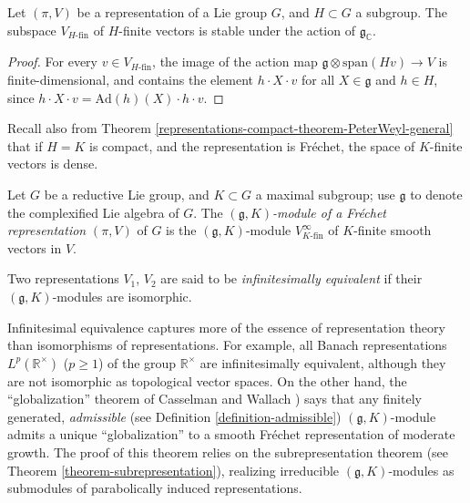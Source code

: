 \begin{lemma}
 \label{lemma-gK-of-representation}
Let $(\pi, V)$ be a representation of a Lie group $G$, and $H\subset G$ a subgroup. The subspace $V_{H\text{-fin}}$ of $H$-finite vectors is stable under the action of $\mathfrak g_{\mathbb C}$.
\end{lemma}

\begin{proof}
 For every $v\in V_{H\text{-fin}}$, the image of the action map $\mathfrak g \otimes \text{span}(Hv) \to V$ is finite-dimensional, and contains the element $h\cdot X\cdot v$ for all $X\in \mathfrak g$ and $h\in H$, since $h\cdot X\cdot v = \text{Ad}(h)(X)\cdot h\cdot v$.
\end{proof}


Recall also from Theorem \ref{representations-compact-theorem-PeterWeyl-general} that if $H=K$ is compact, and the representation is Fr\'echet, the space of $K$-finite vectors is dense. 



\begin{definition}
 \label{definition-gK-of-representation}
Let $G$ be a reductive Lie group, and $K\subset G$ a maximal subgroup; use $\mathfrak g$ to denote the complexified Lie algebra of $G$. The {\it $(\mathfrak g, K)$-module of a Fr\'echet representation} $(\pi, V)$ of $G$ is the  $(\mathfrak g, K)$-module $V^\infty_{K\text{-fin}}$ of $K$-finite smooth vectors in $V$. 

Two representations $V_1$, $V_2$ are said to be {\it infinitesimally equivalent} if their $(\mathfrak g, K)$-modules are isomorphic.
\end{definition}


\begin{remark}
 \label{remark-infinitesimal-equivalence}
Infinitesimal equivalence captures more of the essence of representation theory than isomorphisms of representations. For example, all Banach representations $L^p(\mathbb R^\times)$ ($p\ge 1$) of the group $\mathbb R^\times$ are infinitesimally equivalent, although they are not isomorphic as topological vector spaces. On the other hand, the ``globalization'' theorem of Casselman and Wallach \cite{Casselman-canonicalextensions, Wallach-RR2, Bernstein-Kroetz}) says that any finitely generated, \emph{admissible} (see Definition \ref{definition-admissible}) $(\mathfrak g, K)$-module admits a unique ``globalization'' to a smooth Fr\'echet representation of moderate growth. The proof of this theorem relies on the subrepresentation theorem (see Theorem \ref{theorem-subrepresentation}), realizing irreducible $(\mathfrak g,K)$-modules as submodules of parabolically induced representations.
\end{remark}



